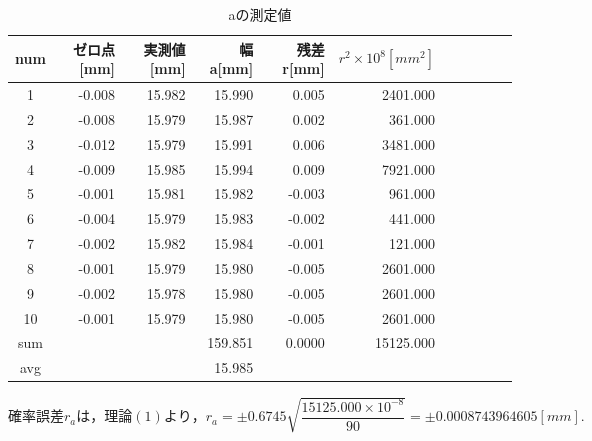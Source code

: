 \documentclass[a4paper,1pt]{jsarticle}
\begin{document}
\begin{table}[H]
  \caption{aの測定値}
  \label{table:SpeedOfLight}
  \centering
  \begin{tabular}{|c||r|r|r|r|r|r|r|r|r|r|}
    \hline
    num & ゼロ点[mm] & 実測値[mm] & 幅 a[mm] & 残差 r[mm] & $r^2\times10^8[mm^2]$  \\
    \hline\hline
    1 & -0.008 & 15.982 & 15.990 & 0.005 & 2401.000 \\
    2 & -0.008 & 15.979 & 15.987 & 0.002 & 361.000 \\
    3 & -0.012 & 15.979 & 15.991 & 0.006 & 3481.000 \\
    4 & -0.009 & 15.985 & 15.994 & 0.009 & 7921.000 \\
    5 & -0.001 & 15.981 & 15.982 & -0.003 & 961.000 \\
    6 & -0.004 & 15.979 & 15.983 & -0.002 & 441.000 \\
    7 & -0.002 & 15.982 & 15.984 & -0.001 & 121.000 \\
    8 & -0.001 & 15.979 & 15.980 & -0.005 & 2601.000 \\
    9 & -0.002 & 15.978 & 15.980 & -0.005 & 2601.000 \\
    10 & -0.001 & 15.979 & 15.980 & -0.005 & 2601.000 \\
    
    \hline\hline
    sum &  &  & 159.851 & 0.0000 & 15125.000 \\
    \hline
    avg &  &  & 15.985 &  &  \\

    \hline
  \end{tabular}

\end{table}

$確率誤差r_aは，理論(1)より，r_a=\pm0.6745\sqrt{\dfrac{15125.000\times10^{-8}}{90}}=\pm0.0008743964605[mm].$
\end{document}
